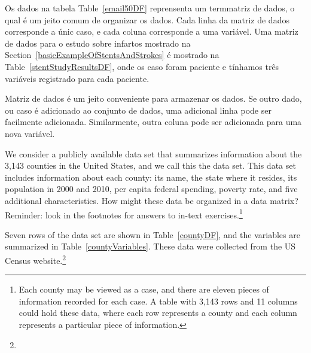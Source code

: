 
Os dados na tabela Table~\ref{email50DF} reprensenta um term{matriz de dados}, o qual é um jeito comum de organizar os dados. Cada linha da matriz de dados corresponde a únic caso, e cada coluna corresponde a uma variável. Uma matriz de dados para o estudo sobre infartos mostrado na Section~\ref{basicExampleOfStentsAndStrokes} é mostrado na Table~\vref{stentStudyResultsDF}, onde os caso foram paciente e tínhamos três variáveis registrado para cada paciente. 

Matriz de dados é um jeito conveniente para armazenar os dados. Se outro dado, ou caso é adicionado ao conjunto de dados, uma adicional linha pode ser facilmente adicionada. Similarmente, outra coluna pode ser adicionada para uma nova variável.


\begin{exercise}
We consider a publicly available data set that summarizes information about the 3,143 counties in the United States, and we call this the  data set. This data set includes information about each county: its name, the state where it resides, its population in 2000 and 2010, per capita federal spending, poverty rate, and five additional characteristics. How might these data be organized in a data matrix? Reminder: look in the footnotes for answers to in-text exercises.\footnote{Each county may be viewed as a case, and there are eleven pieces of information recorded for each case. A table with 3,143 rows and 11 columns could hold these data, where each row represents a county and each column represents a particular piece of information.}
\end{exercise}

\noindent Seven rows of the  data set are shown in Table~\ref{countyDF}, and the variables are summarized in Table~\ref{countyVariables}. These data were collected from the US Census website.\footnote{}

